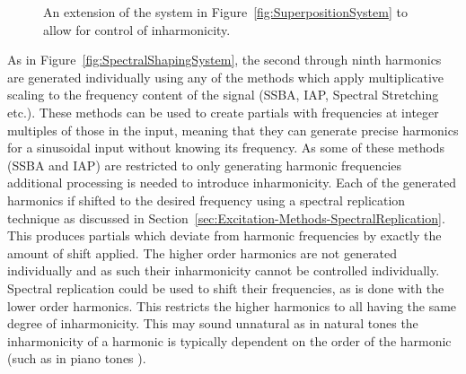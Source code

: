 \begin{figure}[h!]
			\caption{An extension of the system in Figure~\ref{fig:SuperpositionSystem} to allow for control
			         of inharmonicity.}
			\label{fig:InharmonicitySystem}
		\end{figure}

		As in Figure~\ref{fig:SpectralShapingSystem}, the second through ninth harmonics are generated individually
		using any of the methods which apply multiplicative scaling to the frequency content of the signal (SSBA,
		IAP, Spectral Stretching etc.). These methods can be used to create partials with frequencies at integer
		multiples of those in the input, meaning that they can generate precise harmonics for a sinusoidal input
		without knowing its frequency. As some of these methods (SSBA and IAP) are restricted to only generating
		harmonic frequencies additional processing is needed to introduce inharmonicity. Each of the generated
		harmonics if shifted to the desired frequency using a spectral replication technique as discussed in
		Section~\ref{sec:Excitation-Methods-SpectralReplication}. This produces partials which deviate from
		harmonic frequencies by exactly the amount of shift applied. The higher order harmonics are not generated
		individually and as such their inharmonicity cannot be controlled individually. Spectral replication could
		be used to shift their frequencies, as is done with the lower order harmonics. This restricts the higher
		harmonics to all having the same degree of inharmonicity.  This may sound unnatural as in natural tones the
		inharmonicity of a harmonic is typically dependent on the order of the harmonic (such as in piano tones
		\citep{young1952inharmonicity}).

